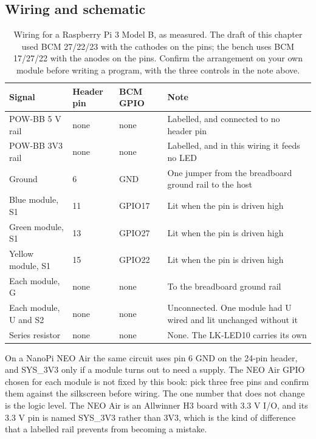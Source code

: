 \subsection*{Wiring and schematic}


\begin{table}[H]\centering\small
\begin{tabular}{p{40mm}p{24mm}p{20mm}p{62mm}}
\toprule
Signal & Header pin & BCM GPIO & Note \\
\midrule
POW-BB 5 V rail & none & none & Labelled, and connected to no header pin \\
POW-BB 3V3 rail & none & none & Labelled, and in this wiring it feeds no LED \\
Ground & 6 & GND & One jumper from the breadboard ground rail to the host \\
Blue module, S1 & 11 & GPIO17 & Lit when the pin is driven high \\
Green module, S1 & 13 & GPIO27 & Lit when the pin is driven high \\
Yellow module, S1 & 15 & GPIO22 & Lit when the pin is driven high \\
Each module, G & none & none & To the breadboard ground rail \\
Each module, U and S2 & none & none & Unconnected. One module had U wired and lit unchanged without it \\
Series resistor & none & none & None. The LK-LED10 carries its own \\
\bottomrule
\end{tabular}
\caption{Wiring for a Raspberry Pi 3 Model B, as measured. The draft of this chapter used BCM 27/22/23 with the cathodes on the pins; the bench uses BCM 17/27/22 with the anodes on the pins. Confirm the arrangement on your own module before writing a program, with the three controls in the note above.}
\end{table}

On a NanoPi NEO Air the same circuit uses pin 6 GND on the 24-pin header, and SYS\_3V3 only if a module turns out to need a supply. The NEO Air GPIO chosen for each module is not fixed by this book: pick three free pins and confirm them against the silkscreen before wiring. The one number that does not change is the logic level. The NEO Air is an Allwinner H3 board with 3.3 V I/O, and its 3.3 V pin is named SYS\_3V3 rather than 3V3, which is the kind of difference that a labelled rail prevents from becoming a mistake.

